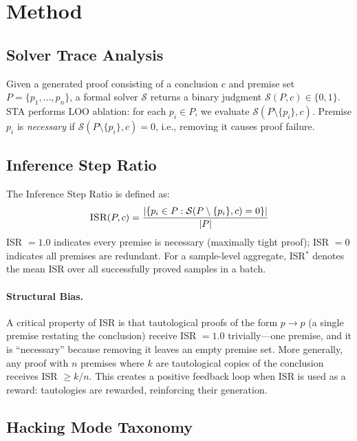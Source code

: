 \documentclass[11pt,a4paper]{article}
\newcommand{\isr}{\textsc{ISR}}
\newcommand{\sta}{\textsc{STA}}
\begin{document}
\section{Method}

\subsection{Solver Trace Analysis}

Given a generated proof consisting of a conclusion $c$ and premise set $P = \{p_1, \ldots, p_n\}$, a formal solver $\mathcal{S}$ returns a binary judgment $\mathcal{S}(P, c) \in \{0, 1\}$.
\sta{} performs LOO ablation: for each $p_i \in P$, we evaluate $\mathcal{S}(P \setminus \{p_i\}, c)$.
Premise $p_i$ is \emph{necessary} if $\mathcal{S}(P \setminus \{p_i\}, c) = 0$, i.e., removing it causes proof failure.

\subsection{Inference Step Ratio}

The Inference Step Ratio is defined as:
\begin{equation}
\isr{}(P, c) = \frac{|\{p_i \in P : \mathcal{S}(P \setminus \{p_i\}, c) = 0\}|}{|P|}
\end{equation}
\isr{} $= 1.0$ indicates every premise is necessary (maximally tight proof); \isr{} $= 0$ indicates all premises are redundant.
For a sample-level aggregate, \isr{}$^*$ denotes the mean \isr{} over all successfully proved samples in a batch.

\paragraph{Structural Bias.}
A critical property of \isr{} is that tautological proofs of the form $p \rightarrow p$ (a single premise restating the conclusion) receive \isr{} $= 1.0$ trivially---one premise, and it is ``necessary'' because removing it leaves an empty premise set.
More generally, any proof with $n$ premises where $k$ are tautological copies of the conclusion receives \isr{} $\geq k/n$.
This creates a positive feedback loop when \isr{} is used as a reward: tautologies are rewarded, reinforcing their generation.

\subsection{Hacking Mode Taxonomy}
\label{sec:taxonomy}
\end{document}
